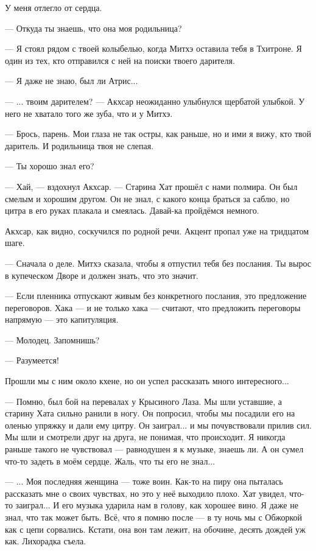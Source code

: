 У меня отлегло от сердца.

--- Откуда ты знаешь, что она моя родильница?

--- Я стоял рядом с твоей колыбелью, когда Митхэ оставила тебя в Тхитроне.
Я один из тех, кто отправился с ней на поиски твоего дарителя.

--- Я даже не знаю, был ли Атрис...

--- ... твоим дарителем? --- Акхсар неожиданно улыбнулся щербатой улыбкой.
У него не хватало того же зуба, что и у Митхэ.

--- Брось, парень.
Мои глаза не так остры, как раньше, но и ими я вижу, кто твой даритель.
И родильница твоя не слепая.

--- Ты хорошо знал его?

--- Хай, --- вздохнул Акхсар.
--- Старина Хат прошёл с нами полмира.
Он был смелым и хорошим другом.
Он не знал, с какого конца браться за саблю, но цитра в его руках плакала и смеялась.
Давай-ка пройдёмся немного.

Акхсар, как видно, соскучился по родной речи.
Акцент пропал уже на тридцатом шаге.

--- Сначала о деле.
Митхэ сказала, чтобы я отпустил тебя без послания.
Ты вырос в купеческом Дворе и должен знать, что это значит.

--- Если пленника отпускают живым без конкретного послания, это предложение переговоров.
Хака --- и не только хака --- считают, что предложить переговоры напрямую --- это капитуляция.

--- Молодец.
Запомнишь?

--- Разумеется!

Прошли мы с ним около кхене, но он успел рассказать много интересного...

--- Помню, был бой на перевалах у Крысиного Лаза.
Мы шли уставшие, а старину Хата сильно ранили в ногу.
Он попросил, чтобы мы посадили его на оленью упряжку и дали ему цитру.
Он заиграл... и мы почувствовали прилив сил.
Мы шли и смотрели друг на друга, не понимая, что происходит.
Я никогда раньше такого не чувствовал --- равнодушен я к музыке, знаешь ли.
А он сумел что-то задеть в моём сердце.
Жаль, что ты его не знал...

--- ... Моя последняя женщина --- тоже воин.
Как-то на пиру она пыталась рассказать мне о своих чувствах, но это у неё выходило плохо.
Хат увидел, что-то заиграл...
И его музыка ударила нам в голову, как хорошее вино.
Я даже не знал, что так может быть.
Всё, что я помню после --- в ту ночь мы с Обжоркой как с цепи сорвались.
Кстати, она вон там лежит, на обочине, десять дождей уж как.
Лихорадка съела.

